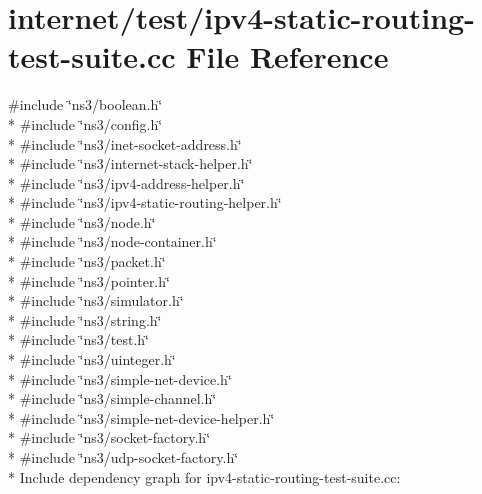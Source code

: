 \hypertarget{ipv4-static-routing-test-suite_8cc}{}\section{internet/test/ipv4-\/static-\/routing-\/test-\/suite.cc File Reference}
\label{ipv4-static-routing-test-suite_8cc}
{\ttfamily \#include \char`\"{}ns3/boolean.\+h\char`\"{}}\\*
{\ttfamily \#include \char`\"{}ns3/config.\+h\char`\"{}}\\*
{\ttfamily \#include \char`\"{}ns3/inet-\/socket-\/address.\+h\char`\"{}}\\*
{\ttfamily \#include \char`\"{}ns3/internet-\/stack-\/helper.\+h\char`\"{}}\\*
{\ttfamily \#include \char`\"{}ns3/ipv4-\/address-\/helper.\+h\char`\"{}}\\*
{\ttfamily \#include \char`\"{}ns3/ipv4-\/static-\/routing-\/helper.\+h\char`\"{}}\\*
{\ttfamily \#include \char`\"{}ns3/node.\+h\char`\"{}}\\*
{\ttfamily \#include \char`\"{}ns3/node-\/container.\+h\char`\"{}}\\*
{\ttfamily \#include \char`\"{}ns3/packet.\+h\char`\"{}}\\*
{\ttfamily \#include \char`\"{}ns3/pointer.\+h\char`\"{}}\\*
{\ttfamily \#include \char`\"{}ns3/simulator.\+h\char`\"{}}\\*
{\ttfamily \#include \char`\"{}ns3/string.\+h\char`\"{}}\\*
{\ttfamily \#include \char`\"{}ns3/test.\+h\char`\"{}}\\*
{\ttfamily \#include \char`\"{}ns3/uinteger.\+h\char`\"{}}\\*
{\ttfamily \#include \char`\"{}ns3/simple-\/net-\/device.\+h\char`\"{}}\\*
{\ttfamily \#include \char`\"{}ns3/simple-\/channel.\+h\char`\"{}}\\*
{\ttfamily \#include \char`\"{}ns3/simple-\/net-\/device-\/helper.\+h\char`\"{}}\\*
{\ttfamily \#include \char`\"{}ns3/socket-\/factory.\+h\char`\"{}}\\*
{\ttfamily \#include \char`\"{}ns3/udp-\/socket-\/factory.\+h\char`\"{}}\\*
Include dependency graph for ipv4-\/static-\/routing-\/test-\/suite.cc\+:
